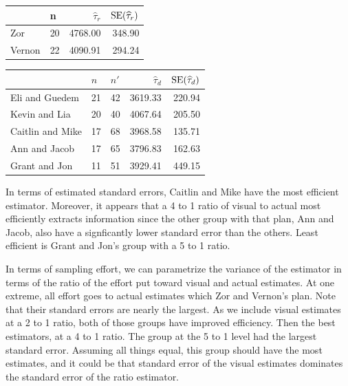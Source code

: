 \documentclass[usenames,dvipsnames]{homework}
\begin{document}
\begin{longproblem}
\begin{solution}
\begin{center}
\renewcommand{\arraystretch}{1.6}
\begin{tabular}{l|l r r }
       &  n   &$\hat\tau_r$&$\mathrm{SE}(\widehat\tau_r)$ \\\hline
Zor    & 20   &  4768.00 & 348.90 \\
Vernon & 22   &  4090.91 & 294.24 \\
\end{tabular}
\begin{tabular}{l|l l r r}
		 & $n$& $n'$&$\hat\tau_{d} $&$\mathrm{SE}(\widehat\tau_d)$ \\\hline
Eli and Guedem   & 21 & 42  &  3619.33   &   220.94 \\ 
Kevin and Lia    & 20 & 40  &  4067.64   &   205.50 \\
Caitlin and Mike & 17 & 68  &  3968.58   &   135.71 \\
Ann and Jacob    & 17 & 65  &  3796.83   &   162.63 \\
Grant and Jon    & 11 & 51  &  3929.41   &   449.15 \\\hline
\end{tabular}
\end{center}
\end{solution}

\begin{solution}
  In terms of estimated standard errors, Caitlin and Mike have the most
  efficient estimator. Moreover, it appears that a 4 to 1 ratio of visual to
  actual most efficiently extracts information since the other group with that
  plan, Ann and Jacob, also have a signficantly lower standard error than the
  others. Least efficient is Grant and Jon's group with a 5 to 1 ratio. 
  
  In terms of sampling effort, we can parametrize the variance of the estimator
  in terms of the ratio of the effort put toward visual and actual estimates.
  At one extreme, all effort goes to actual estimates which Zor and Vernon's plan.
  Note that their standard errors are nearly the largest.  As we include
  visual estimates at a 2 to 1 ratio, both of those groups have improved
  efficiency. Then the best estimators, at a 4 to 1 ratio. The group at the 5
  to 1 level had the largest standard error. Assuming all things equal,
  this group should have the most estimates, and it could be that standard
  error of the visual estimates dominates the standard error of the ratio estimator.
  

\end{solution}
\end{longproblem}
\end{document}

